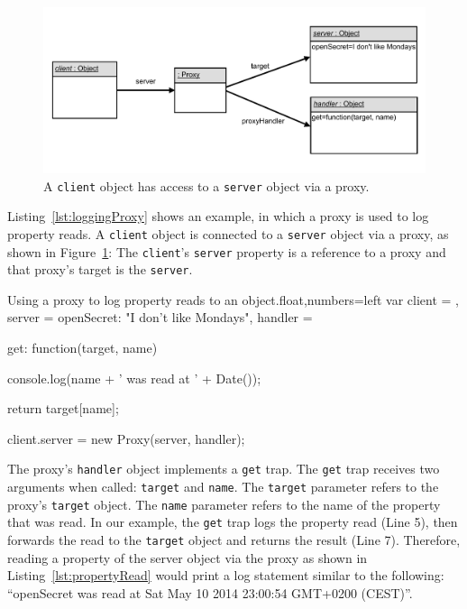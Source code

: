 \begin{figure}[h]
    \centering
    \includegraphics[width=\textwidth]{figures/5_implementation/1_loggingProxy.pdf}
    \caption{A \lstinline{client} object has access to a \lstinline{server} object via a proxy.}
    \label{fig:LoggingProxy}
\end{figure}

Listing~\ref{lst:loggingProxy} shows an example, in which a proxy is used to log property reads.
A \lstinline{client} object is connected to a \lstinline{server} object via a proxy, as shown in Figure~\ref{fig:LoggingProxy}:
The \lstinline{client}'s \lstinline{server} property is a reference to a proxy and that proxy's target is the \lstinline{server}.

\begin{code}{Using a proxy to log property reads to an object.}{float,numbers=left}
var client = {},
    server = {openSecret: "I don't like Mondays"},
    handler = {
        get: function(target, name) {
            console.log(name + ' was read at ' + Date());
            
            return target[name];
        }
    }

client.server = new Proxy(server, handler);
\end{code}
\iffalse
\end{verbatim}\fi

The proxy's \lstinline{handler} object implements a \lstinline{get} trap.
The \lstinline{get} trap receives two arguments when called: \lstinline{target} and \lstinline{name}.
The \lstinline{target} parameter refers to the proxy's \lstinline{target} object.
The \lstinline{name} parameter refers to the name of the property that was read.
In our example, the \lstinline{get} trap logs the property read (Line 5), then forwards the read to the \lstinline{target} object and returns the result (Line 7).
Therefore, reading a property of the server object via the proxy as shown in Listing~\ref{lst:propertyRead} would print a log statement similar to the following: ``openSecret was read at Sat May 10 2014 23:00:54 GMT+0200 (CEST)''.

